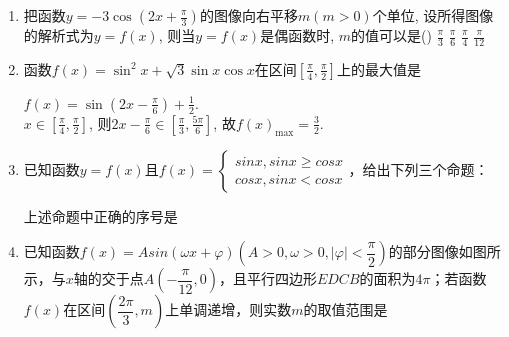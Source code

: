 \begin{enumerate}
\item 把函数$y=-3\cos(2x+\frac{\pi}{3})$的图像向右平移$m(m>0)$个单位, 设所得图像的解析式为$y=f(x)$, 则当$y=f(x)$是偶函数时, $m$的值可以是\dotfill()
\xx
{$\frac{\pi}{3}$}
{$\frac{\pi}{6}$}
{$\frac{\pi}{4}$}
{$\frac{\pi}{12}$}


\item 函数$f(x)=\sin^2x+\sqrt{3}\sin{x}\cos{x}$在区间$[\frac{\pi}{4},\frac{\pi}{2}]$上的最大值是
\begin{jieda}
$f(x)=\sin(2x-\frac{\pi}{6})+\frac{1}{2}$. \\
$x\in[\frac{\pi}{4},\frac{\pi}{2}]$, 则$2x-\frac{\pi}{6}\in[\frac{\pi}{3},\frac{5\pi}{6}]$, 故$f(x)_{\max}=\frac{3}{2}$. 
\end{jieda}

\item 已知函数$y = f(x)$且$f(x) = \left\{\begin{array}{l}
     sinx, sinx \geq cosx  \\
     cosx, sinx < cosx
\end{array}\right.$，给出下列三个命题：
上述命题中正确的序号是
\begin{jieda}
\end{jieda}
\item 已知函数$f(x) = Asin(\omega x + \varphi) \left(A > 0, \omega > 0, |\varphi| < \dfrac{\pi}{2} \right)$的部分图像如图所示，与$x$轴的交于点$A\left(-\dfrac{\pi}{12}, 0\right)$，且平行四边形$EDCB$的面积为$4\pi$；若函数$f(x)$在区间$\left(\dfrac{2\pi}{3}, m\right)$上单调递增，则实数$m$的取值范围是\blkda{$\left(\dfrac{2\pi}{3}, \dfrac{7\pi}{6}\right]$}

\end{enumerate}
